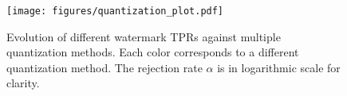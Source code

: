 \begin{figure}[t]
    \centering
    \texttt{[image: figures/quantization\_plot.pdf]}
    \caption{Evolution of different watermark TPRs against multiple quantization methods. Each color corresponds to a different quantization method. The rejection rate $\alpha$ is in logarithmic scale for clarity.}
    \label{fig:quantization_plot}
    \vspace{-0.2em}
\end{figure}
